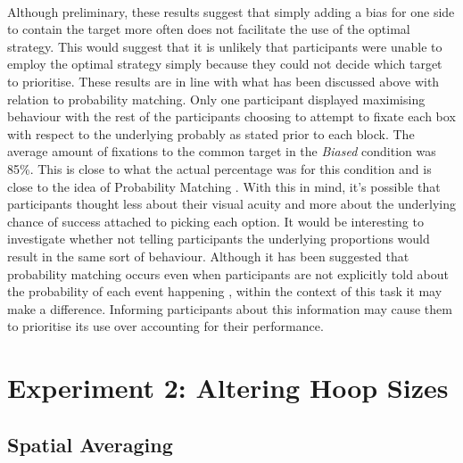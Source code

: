 \documentclass[12pt]{article}
\begin{document}
\paragraph{} Although preliminary, these results suggest that simply adding a bias for one side to contain the target more often does not facilitate the use of the optimal strategy. This would suggest that it is unlikely that participants were unable to employ the optimal strategy simply because they could not decide which target to prioritise. These results are in line with what has been discussed above with relation to probability matching. Only one participant displayed maximising behaviour with the rest of the participants choosing to attempt to fixate each box with respect to the underlying probably as stated prior to each block. The average amount of fixations to the common target in the \textit{Biased} condition was 85\%. This is close to what the actual percentage was for this condition and is close to the idea of Probability Matching \citep{Koehler2010}. With this in mind, it's possible that participants thought less about their visual acuity and more about the underlying chance of success attached to picking each option. It would be interesting to investigate whether not telling participants the underlying proportions would result in the same sort of behaviour. Although it has been suggested that probability matching occurs even when participants are not explicitly told about the probability of each event happening \citep{Gao2015}, within the context of this task it may make a difference. Informing participants about this information may cause them to prioritise its use over accounting for their performance.

\section*{Experiment 2: Altering Hoop Sizes}

\subsection*{Spatial Averaging}
\end{document}
